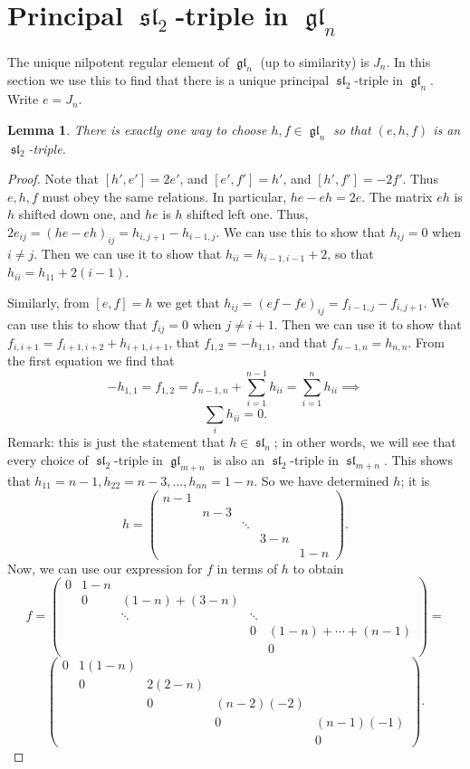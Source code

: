\documentclass[12pt,psamsfonts]{article}
\DeclareMathOperator{\gl}{\mathfrak{gl}}
\DeclareMathOperator{\spl}{\mathfrak{sl}}
\newtheorem{lemma}[theorem]{Lemma}
\begin{document}
\section{Principal \(\spl_2\)-triple in \(\gl_n\)}
The unique nilpotent regular element of \(\gl_n\) (up to similarity) is \(J_n\).
In this section we use this to find that there is a unique principal \(\spl_2\)-triple in \(\gl_n\).
Write \(e = J_n\).
\begin{lemma}\label{simple_sl2_triple}
    There is exactly one way to choose \(h, f \in \gl_n\) so that \((e, h, f)\) is an \(\spl_2\)-triple.
\end{lemma}
\begin{proof}
    
Note that \([h', e'] = 2e'\), and \([e', f'] = h'\), and \([h', f'] = -2f'\).
Thus \(e, h, f\) must obey the same relations.
In particular, \(he - eh = 2e\).  
The matrix \(eh\) is \(h\) shifted down one, and \(he\) is \(h\) shifted left one.
Thus, \(2e_{ij} = (he - eh)_{ij} = h_{i, j + 1} - h_{i - 1, j}\).
We can use this to show that \(h_{ij} = 0\) when \(i \neq j\).
Then we can use it to show that \(h_{ii} = h_{i - 1, i - 1} + 2\), so that \(h_{ii} = h_{11} + 2(i - 1)\).
\par Similarly, from \([e, f] = h\) we get that \(h_{ij} = (ef - fe)_{ij} = f_{i - 1, j} - f_{i, j + 1}\).
We can use this to show that \(f_{ij} = 0\) when \(j \neq i + 1\).
Then we can use it to show that \(f_{i,i + 1} = f_{i + 1, i + 2} + h_{i + 1, i + 1}\), that \(f_{1,2} = -h_{1, 1}\), and that \(f_{n - 1, n} = h_{n,n}\).
From the first equation we find that
\[-h_{1,1} = f_{1, 2} = f_{n - 1, n} + \sum_{i = 1}^{n - 1} h_{ii} = \sum_{i = 1}^{n} h_{ii} \implies\]
\[\sum_i h_{ii} = 0.\]
Remark: this is just the statement that \(h \in \spl_n\); in other words, we will see that every choice of \(\spl_2\)-triple in \(\gl_{m + n}\) is also an \(\spl_2\)-triple in \(\spl_{m + n}\).
This shows that \(h_{11} = n - 1, h_{22} = n - 3, ..., h_{nn} = 1 - n\).
So we have determined \(h\); it is 
\[h = \begin{pmatrix}
    n - 1  & \\
    & n - 3 \\
    & & \ddots \\
    & & & 3 - n \\
    & & & & 1 - n 
\end{pmatrix}.\]
Now, we can use our expression for \(f\) in terms of \(h\) to obtain
\[f = \begin{pmatrix}
    0 & 1 - n \\
    & 0 & (1 - n) + (3 - n) \\
    & & \ddots & \ddots \\
    & & & 0 & (1 - n) + \cdots + (n - 1) \\
    & & & & 0
\end{pmatrix} = \]
\[\begin{pmatrix}
    0 & 1 (1 - n) \\
      & 0 & 2 (2 - n) \\
    & & 0 & (n - 2) (-2) \\
    & & & 0 & (n - 1) (-1)\\
    & &  & & 0
\end{pmatrix}.\]
\end{proof}
\end{document}
